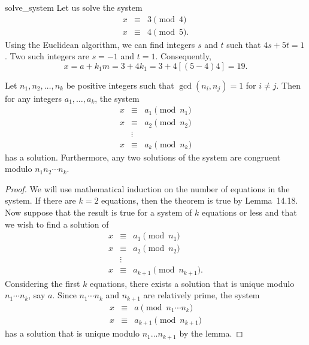  
\begin{example}{solve_system}
Let us solve the system
\begin{eqnarray*}
x & \equiv & 3 \pmod{4} \\
x & \equiv & 4 \pmod{5}. 
\end{eqnarray*}
Using the Euclidean algorithm, we can find integers $s$ and $t$ such
that $4s + 5t =1$. Two such integers are $s = -1$ and $t = 1$.
Consequently,
\[
x = a + k_1 m = 3 + 4k_1 = 3 + 4[(5-4)4] = 19.
\]
\end{example}
 
 
\begin{theorem}
Let $n_1, n_2, \ldots, n_k$ be positive integers such that $\gcd(n_i, n_j)
= 1$ for $i \neq j$. Then for any integers $a_1, \ldots, a_k$, the
system
\begin{eqnarray*}
x & \equiv & a_1 \pmod{n_1} \\
x & \equiv & a_2 \pmod{n_2} \\
  & \vdots & \\
x & \equiv & a_k \pmod{n_k}
\end{eqnarray*}
has a solution.  Furthermore, any two solutions of the system are
congruent modulo $n_1 n_2 \cdots n_k$.
\end{theorem}
 
\begin{proof}
We will use mathematical induction on the number of equations in the
system. If there are $k= 2$ equations, then the theorem is true by 
Lemma~14.18. Now suppose that the result is true for a system of $k$ 
equations or less and that we wish to find a solution of 
\begin{eqnarray*}
x & \equiv & a_1 \pmod{n_1} \\
x & \equiv & a_2 \pmod{n_2} \\
  & \vdots & \\
x & \equiv & a_{k+1} \pmod{n_{k+1}}.
\end{eqnarray*}
Considering the first $k$ equations, there exists a solution that is
unique modulo $n_1 \cdots n_k$, say $a$. Since $n_1 \cdots n_k$ and
$n_{k+1}$ are relatively prime, the system 
\begin{eqnarray*}
x & \equiv & a \pmod{n_1 \cdots n_k } \\
x & \equiv & a_{k+1} \pmod{n_{k+1}}
\end{eqnarray*}
has a solution that is unique modulo $n_1 \ldots n_{k+1}$ by the
lemma.
\end{proof}
 
